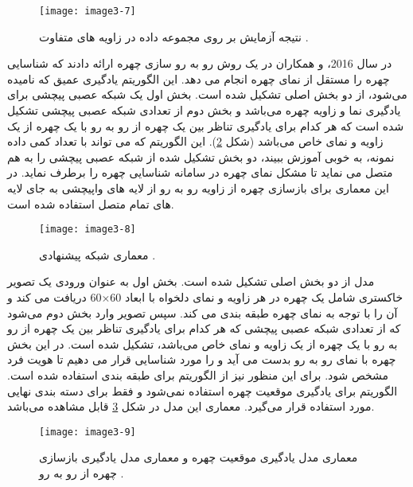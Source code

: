 \begin{figure}[h]
\centering
  \texttt{[image: image3-7]}
  \caption{نتیجه آزمایش بر روی مجموعه داده   در زاویه های متفاوت \cite{HAGHIGHAT201623}.}
  \label{image3-7}
\end{figure}

\noindent
در سال 2016،  و همکاران در \cite{7532959} یک روش رو به رو سازی چهره ارائه دادند که شناسایی چهره را مستقل از نمای چهره  انجام می دهد. این الگوریتم یادگیری عمیق که  نامیده می‌شود، از دو بخش اصلی تشکیل شده است. بخش اول یک شبکه عصبی پیچشی برای یادگیری نما و زاویه چهره می‌باشد و بخش دوم از تعدادی شبکه عصبی پیچشی تشکیل شده است که هر کدام برای یادگیری تناظر  بین یک چهره از رو به رو با یک چهره از یک زاویه و نمای خاص می‌باشد (شکل \ref{image3-8}). این الگوریتم که می تواند با تعداد کمی داده نمونه، به خوبی آموزش ببیند، دو بخش تشکیل شده از شبکه عصبی پیچشی را به هم متصل می نماید تا مشکل نمای چهره در سامانه شناسایی چهره را برطرف نماید. در این معماری برای بازسازی چهره از زاویه رو به رو از لایه های واپیچشی  به جای لایه های تمام متصل استفاده شده است.

\begin{figure}[h]
\centering
  \texttt{[image: image3-8]}
  \caption{معماری شبکه پیشنهادی   \cite{7532959}.}
  \label{image3-8}
\end{figure}

\noindent
مدل  از دو بخش اصلی تشکیل شده است. بخش اول به عنوان ورودی یک تصویر خاکستری  شامل یک چهره در هر زاویه و نمای دلخواه با ابعاد 60×60 دریافت می کند و آن را با توجه به نمای چهره طبقه بندی  می کند. سپس تصویر وارد بخش دوم می‌شود که از تعدادی شبکه عصبی پیچشی که هر کدام برای یادگیری تناظر بین یک چهره از رو به رو با یک چهره از یک زاویه و نمای خاص می‌باشد، تشکیل شده است. در این بخش چهره با نمای رو به رو بدست می آید و را مورد شناسایی قرار می دهیم تا هویت فرد مشخص شود. برای این منظور نیز از الگوریتم   برای طبقه بندی استفاده شده است. الگوریتم  برای یادگیری موقعیت چهره استفاده نمی‌شود و فقط برای دسته بندی نهایی مورد استفاده قرار می‌گیرد. معماری این مدل در شکل \ref{image3-9} قابل مشاهده می‌باشد.

\begin{figure}[h]
\centering
  \texttt{[image: image3-9]}
  \caption{ معماری مدل یادگیری موقعیت چهره و  معماری مدل یادگیری بازسازی چهره از رو به رو \cite{7532959}.}
  \label{image3-9}
\end{figure}

